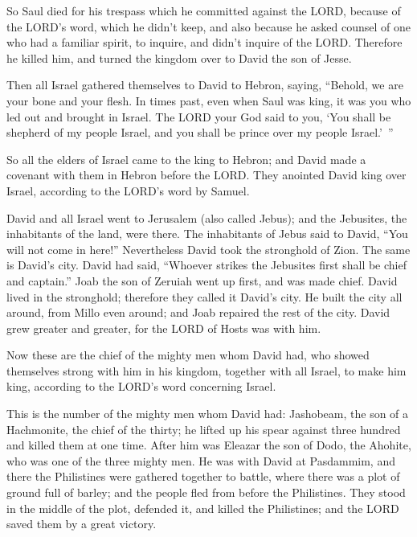 \myverse{}So Saul died for his trespass which he committed against the
LORD, because of the LORD’s word, which he didn’t keep, and also because he asked counsel of one who had
a familiar spirit, to inquire,
\myverse{}and didn’t inquire of the LORD. Therefore he killed him, and turned the kingdom
over to David the son of Jesse.


\mychapter{} \myverse*{}Then all Israel gathered themselves to David to Hebron, saying,
“Behold, we are your bone and your flesh.
\myverse{}In times past, even when Saul was king, it was you who led out and brought
in Israel. The LORD your God said to you, ‘You shall be shepherd of my people Israel, and you shall be
prince over my people Israel.’ ”

\myverse{}So all the elders of Israel came to the king to Hebron; and David
made a covenant with them in Hebron before the LORD. They anointed David king over Israel, according to
the LORD’s word by Samuel.

\myverse{}David and all Israel went to Jerusalem (also called Jebus); and
the Jebusites, the inhabitants of the land, were there.
\myverse{}The inhabitants of Jebus said to David, “You will not come in here!” Nevertheless
David took the stronghold of Zion. The same is David’s city.
\myverse{}David had said, “Whoever strikes the Jebusites first shall be chief and captain.”
Joab the son of Zeruiah went up first, and was made chief.
\myverse{}David lived in the stronghold; therefore they called it David’s city.
\myverse{}He built the city all around, from Millo even around; and Joab repaired the
rest of the city.
\myverse{}David grew greater and greater, for the LORD of Hosts was with him.

\myverse{}Now these are the chief of the mighty men whom David had, who
showed themselves strong with him in his kingdom, together with all Israel, to make him king, according
to the LORD’s word concerning Israel.

\myverse{}This is the number of the mighty men whom David had: Jashobeam,
the son of a Hachmonite, the chief of the thirty; he lifted up his spear against three hundred and killed
them at one time.
\myverse{}After him was Eleazar the son of Dodo, the Ahohite, who was one of the three
mighty men.
\myverse{}He was with David at Pasdammim, and there the Philistines were gathered together
to battle, where there was a plot of ground full of barley; and the people fled from before the Philistines.
\myverse{}They stood in the middle of the plot, defended it, and killed the Philistines;
and the LORD saved them by a great victory.

